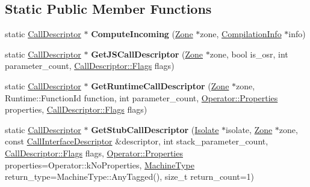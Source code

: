 \subsection*{Static Public Member Functions}
\begin{DoxyCompactItemize}
\item 
static \hyperlink{classv8_1_1internal_1_1compiler_1_1_call_descriptor}{Call\+Descriptor} $\ast$ {\bfseries Compute\+Incoming} (\hyperlink{classv8_1_1internal_1_1_zone}{Zone} $\ast$zone, \hyperlink{classv8_1_1internal_1_1_compilation_info}{Compilation\+Info} $\ast$info)\hypertarget{classv8_1_1internal_1_1compiler_1_1_linkage_ac0c3e93f5daf6edb23a0b1c10b3b30b8}{}\label{classv8_1_1internal_1_1compiler_1_1_linkage_ac0c3e93f5daf6edb23a0b1c10b3b30b8}

\item 
static \hyperlink{classv8_1_1internal_1_1compiler_1_1_call_descriptor}{Call\+Descriptor} $\ast$ {\bfseries Get\+J\+S\+Call\+Descriptor} (\hyperlink{classv8_1_1internal_1_1_zone}{Zone} $\ast$zone, bool is\+\_\+osr, int parameter\+\_\+count, \hyperlink{classv8_1_1base_1_1_flags}{Call\+Descriptor\+::\+Flags} flags)\hypertarget{classv8_1_1internal_1_1compiler_1_1_linkage_a3bbe9435f778a029e61ffdf7c400ce95}{}\label{classv8_1_1internal_1_1compiler_1_1_linkage_a3bbe9435f778a029e61ffdf7c400ce95}

\item 
static \hyperlink{classv8_1_1internal_1_1compiler_1_1_call_descriptor}{Call\+Descriptor} $\ast$ {\bfseries Get\+Runtime\+Call\+Descriptor} (\hyperlink{classv8_1_1internal_1_1_zone}{Zone} $\ast$zone, Runtime\+::\+Function\+Id function, int parameter\+\_\+count, \hyperlink{classv8_1_1base_1_1_flags}{Operator\+::\+Properties} properties, \hyperlink{classv8_1_1base_1_1_flags}{Call\+Descriptor\+::\+Flags} flags)\hypertarget{classv8_1_1internal_1_1compiler_1_1_linkage_a193c368e77dbf117689ccbd10ab9fdb1}{}\label{classv8_1_1internal_1_1compiler_1_1_linkage_a193c368e77dbf117689ccbd10ab9fdb1}

\item 
static \hyperlink{classv8_1_1internal_1_1compiler_1_1_call_descriptor}{Call\+Descriptor} $\ast$ {\bfseries Get\+Stub\+Call\+Descriptor} (\hyperlink{classv8_1_1internal_1_1_isolate}{Isolate} $\ast$isolate, \hyperlink{classv8_1_1internal_1_1_zone}{Zone} $\ast$zone, const \hyperlink{classv8_1_1internal_1_1_call_interface_descriptor}{Call\+Interface\+Descriptor} \&descriptor, int stack\+\_\+parameter\+\_\+count, \hyperlink{classv8_1_1base_1_1_flags}{Call\+Descriptor\+::\+Flags} flags, \hyperlink{classv8_1_1base_1_1_flags}{Operator\+::\+Properties} properties=Operator\+::k\+No\+Properties, \hyperlink{classv8_1_1internal_1_1_machine_type}{Machine\+Type} return\+\_\+type=Machine\+Type\+::\+Any\+Tagged(), size\+\_\+t return\+\_\+count=1)\hypertarget{classv8_1_1internal_1_1compiler_1_1_linkage_a1ed67ad00510c1774b3e88bae454f45f}{}\label{classv8_1_1internal_1_1compiler_1_1_linkage_a1ed67ad00510c1774b3e88bae454f45f}


\end{DoxyCompactItemize}
